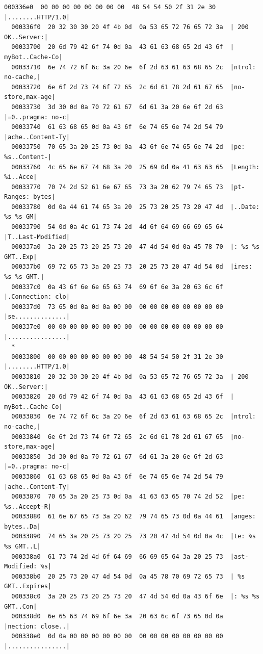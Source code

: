 \documentclass[]{project_plan}
\begin{document}
\begin{lstlisting}[basicstyle=\tiny]
  000336e0  00 00 00 00 00 00 00 00  48 54 54 50 2f 31 2e 30  |........HTTP/1.0|
  000336f0  20 32 30 30 20 4f 4b 0d  0a 53 65 72 76 65 72 3a  | 200 OK..Server:|
  00033700  20 6d 79 42 6f 74 0d 0a  43 61 63 68 65 2d 43 6f  | myBot..Cache-Co|
  00033710  6e 74 72 6f 6c 3a 20 6e  6f 2d 63 61 63 68 65 2c  |ntrol: no-cache,|
  00033720  6e 6f 2d 73 74 6f 72 65  2c 6d 61 78 2d 61 67 65  |no-store,max-age|
  00033730  3d 30 0d 0a 70 72 61 67  6d 61 3a 20 6e 6f 2d 63  |=0..pragma: no-c|
  00033740  61 63 68 65 0d 0a 43 6f  6e 74 65 6e 74 2d 54 79  |ache..Content-Ty|
  00033750  70 65 3a 20 25 73 0d 0a  43 6f 6e 74 65 6e 74 2d  |pe: %s..Content-|
  00033760  4c 65 6e 67 74 68 3a 20  25 69 0d 0a 41 63 63 65  |Length: %i..Acce|
  00033770  70 74 2d 52 61 6e 67 65  73 3a 20 62 79 74 65 73  |pt-Ranges: bytes|
  00033780  0d 0a 44 61 74 65 3a 20  25 73 20 25 73 20 47 4d  |..Date: %s %s GM|
  00033790  54 0d 0a 4c 61 73 74 2d  4d 6f 64 69 66 69 65 64  |T..Last-Modified|
  000337a0  3a 20 25 73 20 25 73 20  47 4d 54 0d 0a 45 78 70  |: %s %s GMT..Exp|
  000337b0  69 72 65 73 3a 20 25 73  20 25 73 20 47 4d 54 0d  |ires: %s %s GMT.|
  000337c0  0a 43 6f 6e 6e 65 63 74  69 6f 6e 3a 20 63 6c 6f  |.Connection: clo|
  000337d0  73 65 0d 0a 0d 0a 00 00  00 00 00 00 00 00 00 00  |se..............|
  000337e0  00 00 00 00 00 00 00 00  00 00 00 00 00 00 00 00  |................|
  *
  00033800  00 00 00 00 00 00 00 00  48 54 54 50 2f 31 2e 30  |........HTTP/1.0|
  00033810  20 32 30 30 20 4f 4b 0d  0a 53 65 72 76 65 72 3a  | 200 OK..Server:|
  00033820  20 6d 79 42 6f 74 0d 0a  43 61 63 68 65 2d 43 6f  | myBot..Cache-Co|
  00033830  6e 74 72 6f 6c 3a 20 6e  6f 2d 63 61 63 68 65 2c  |ntrol: no-cache,|
  00033840  6e 6f 2d 73 74 6f 72 65  2c 6d 61 78 2d 61 67 65  |no-store,max-age|
  00033850  3d 30 0d 0a 70 72 61 67  6d 61 3a 20 6e 6f 2d 63  |=0..pragma: no-c|
  00033860  61 63 68 65 0d 0a 43 6f  6e 74 65 6e 74 2d 54 79  |ache..Content-Ty|
  00033870  70 65 3a 20 25 73 0d 0a  41 63 63 65 70 74 2d 52  |pe: %s..Accept-R|
  00033880  61 6e 67 65 73 3a 20 62  79 74 65 73 0d 0a 44 61  |anges: bytes..Da|
  00033890  74 65 3a 20 25 73 20 25  73 20 47 4d 54 0d 0a 4c  |te: %s %s GMT..L|
  000338a0  61 73 74 2d 4d 6f 64 69  66 69 65 64 3a 20 25 73  |ast-Modified: %s|
  000338b0  20 25 73 20 47 4d 54 0d  0a 45 78 70 69 72 65 73  | %s GMT..Expires|
  000338c0  3a 20 25 73 20 25 73 20  47 4d 54 0d 0a 43 6f 6e  |: %s %s GMT..Con|
  000338d0  6e 65 63 74 69 6f 6e 3a  20 63 6c 6f 73 65 0d 0a  |nection: close..|
  000338e0  0d 0a 00 00 00 00 00 00  00 00 00 00 00 00 00 00  |................|

\end{lstlisting}
\end{document}
